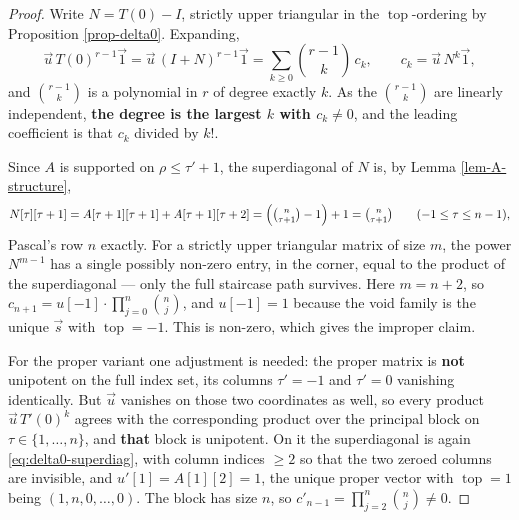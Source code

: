 \documentclass[11pt, a4paper, abstract=yes]{scrartcl}
\theoremstyle{definition}
\theoremstyle{remark}
\theoremstyle{plain}
\newcommand{\tp}{\operatorname{top}}
\begin{document}
\begin{proof}
Write \(N=T(0)-I\), strictly upper triangular in the \(\tp\)-ordering by Proposition
\ref{prop-delta0}. Expanding,
\begin{equation}\label{eq:delta0-expansion}
  \vec u\,T(0)^{r-1}\vec 1=\vec u\,(I+N)^{r-1}\vec 1
  =\sum_{k\ge0}\binom{r-1}{k}\,c_k,\qquad c_k=\vec u\,N^k\vec 1 ,
\end{equation}
and \(\binom{r-1}{k}\) is a polynomial in \(r\) of degree exactly \(k\). As the \(\binom{r-1}{k}\)
are linearly independent, \textbf{the degree is the largest \(k\) with \(c_k\ne0\)}, and the leading
coefficient is that \(c_k\) divided by \(k!\).

Since \(A\) is supported on \(\rho\le\tau'+1\), the superdiagonal of \(N\) is, by
Lemma \ref{lem-A-structure},
\begin{equation}\label{eq:delta0-superdiag}
  N[\tau][\tau+1]=A[\tau+1][\tau+1]+A[\tau+1][\tau+2]
  =\Bigl(\tbinom n{\tau+1}-1\Bigr)+1=\tbinom n{\tau+1}
  \qquad(-1\le\tau\le n-1),
\end{equation}
Pascal's row \(n\) exactly. For a strictly upper triangular matrix of size \(m\), the power
\(N^{m-1}\) has a single possibly non-zero entry, in the corner, equal to the product of the
superdiagonal --- only the full staircase path survives. Here \(m=n+2\), so
\(c_{n+1}=u[-1]\cdot\prod_{j=0}^{n}\binom nj\), and \(u[-1]=1\) because the void family is the unique
\(\vec s\) with \(\tp=-1\). This is non-zero, which gives the improper claim.

For the proper variant one adjustment is needed: the proper matrix is \textbf{not} unipotent on the full
index set, its columns \(\tau'=-1\) and \(\tau'=0\) vanishing identically. But \(\vec u\) vanishes on
those two coordinates as well, so every product \(\vec u\,T'(0)^k\) agrees with the corresponding
product over the principal block on \(\tau\in\lbrace1,\dots,n\rbrace\), and \textbf{that} block is
unipotent. On it the superdiagonal is again \eqref{eq:delta0-superdiag}, with column indices
\(\ge2\) so that the two zeroed columns are invisible, and \(u'[1]=A[1][2]=1\), the unique proper
vector with \(\tp=1\) being \((1,n,0,\dots,0)\). The block has size \(n\), so
\(c'_{n-1}=\prod_{j=2}^{n}\binom nj\ne0\).
\end{proof}
\end{document}
